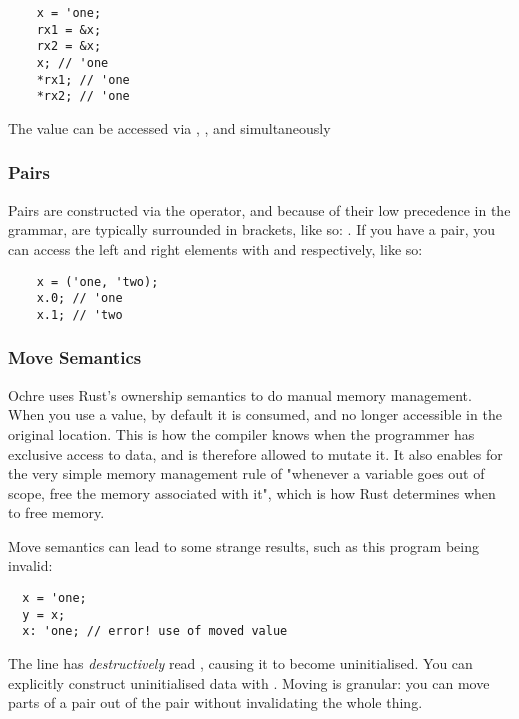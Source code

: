 \documentclass[12pt,twoside]{report}
\begin{document}
\begin{listing}[H]
  \begin{verbatim}
    x = 'one;
    rx1 = &x;
    rx2 = &x;
    x; // 'one
    *rx1; // 'one
    *rx2; // 'one
  \end{verbatim}
  \caption{The value  can be accessed via , , and  simultaneously}
  \label{lst:immref}
\end{listing}

\subsubsection{Pairs}
Pairs are constructed via the \mono{,} operator, and because of their low precedence in the grammar, are typically surrounded in brackets, like so: . If you have a pair, you can access the left and right elements with  and  respectively, like so:

  \begin{verbatim}
    x = ('one, 'two);
    x.0; // 'one
    x.1; // 'two
  \end{verbatim}

\subsubsection{Move Semantics}
Ochre uses Rust's ownership semantics to do manual memory management. When you use a value, by default it is consumed, and no longer accessible in the original location. This is how the compiler knows when the programmer has exclusive access to data, and is therefore allowed to mutate it. It also enables for the very simple memory management rule of "whenever a variable goes out of scope, free the memory associated with it", which is how Rust determines when to free memory.

Move semantics can lead to some strange results, such as this program being invalid:

\begin{verbatim}
  x = 'one;
  y = x;
  x: 'one; // error! use of moved value
\end{verbatim}

The  line has \textit{destructively} read , causing it to become uninitialised. You can explicitly construct uninitialised data with \mono{\_}. Moving is granular: you can move parts of a pair out of the pair without invalidating the whole thing.
\end{document}
